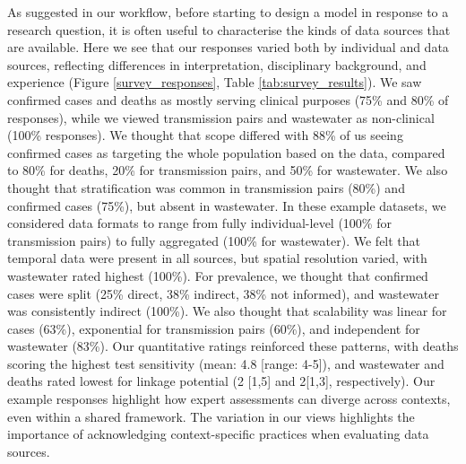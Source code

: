 \documentclass{article}
\begin{document}
As suggested in our workflow, before starting to design a model in response to a research question, it is often useful to characterise the kinds of data sources that are available. Here we see that our responses varied both by individual and data sources, reflecting differences in interpretation, disciplinary background, and experience (Figure \ref{survey_responses}, Table \ref{tab:survey_results}). We saw confirmed cases and deaths as mostly serving clinical purposes (75\% and 80\% of responses), while we viewed transmission pairs and wastewater as non-clinical (100\%  responses). We thought that scope differed with 88\% of us seeing confirmed cases as targeting the whole population based on the data, compared to 80\% for deaths, 20\% for transmission pairs, and 50\% for wastewater. We also thought that stratification was common in transmission pairs (80\%) and confirmed cases (75\%), but absent in wastewater. In these example datasets, we considered data formats to range from fully individual-level (100\% for transmission pairs) to fully aggregated (100\% for wastewater). We felt that temporal data were present in all sources, but spatial resolution varied, with wastewater rated highest (100\%). For prevalence, we thought that confirmed cases were split (25\% direct, 38\% indirect, 38\% not informed), and wastewater was consistently indirect (100\%). We also thought that scalability was linear for cases (63\%), exponential for transmission pairs (60\%), and independent for wastewater (83\%). Our quantitative ratings reinforced these patterns, with deaths scoring the highest test sensitivity (mean: 4.8 [range: 4-5]), and wastewater and deaths rated lowest for linkage potential (2 [1,5] and 2[1,3], respectively). Our example responses highlight how expert assessments can diverge across contexts, even within a shared framework. The variation in our views highlights the importance of acknowledging context-specific practices when evaluating data sources.
\end{document}
